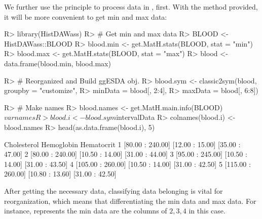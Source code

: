 \documentclass[article]{jss}
\begin{document}
We further use the principle to process  data in , first. With the method  provided, it will be more convenient to get min and max data:
\begin{CodeChunk}
\begin{CodeInput}
R> library(HistDAWass)
R> # Get min and max data
R> BLOOD <- HistDAWass::BLOOD
R> blood.min <- get.MatH.stats(BLOOD, stat = "min")
R> blood.max <- get.MatH.stats(BLOOD, stat = "max")
R> blood <- data.frame(blood.min, blood.max)

R> # Reorganized and Build ggESDA obj.
R> blood.sym <- classic2sym(blood, groupby = "customize",
R>                      minData = blood[, 2:4],
R>                      maxData = blood[, 6:8])

R> # Make names
R> blood.names <- get.MatH.main.info(BLOOD)$varnames
R> blood.i <- blood.sym$intervalData
R> colnames(blood.i) <- blood.names
R> head(as.data.frame(blood.i), 5)
\end{CodeInput}
\begin{CodeOutput}
  Cholesterol      Hemoglobin      Hematocrit
1 [80.00 : 240.00] [12.00 : 15.00] [35.00 : 47.00]
2 [80.00 : 240.00] [10.50 : 14.00] [31.00 : 44.00]
3 [95.00 : 245.00] [10.50 : 14.00] [31.00 : 43.50]
4 [105.00 : 260.00] [10.50 : 14.00] [31.00 : 42.50]
5 [115.00 : 260.00] [10.80 : 13.60] [31.00 : 42.50]
\end{CodeOutput}
\end{CodeChunk}

After getting the necessary data, classifying data belonging is vital for reorganization, which means that differentiating the min data and max data. For instance,  represents the min data are the columns of $2,3,4$ in this case.



\subsubsection[MAINT.Data]{}
\end{document}
